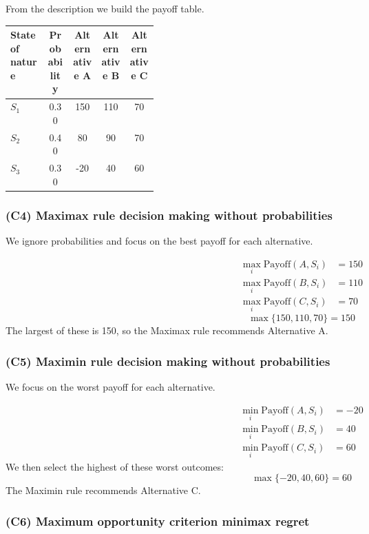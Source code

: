From the description we build the payoff table.

\begin{center}
	\begin{tabularx}{\linewidth}{@{}L{0.25\linewidth}C C C C@{}}
		\toprule
		State of nature & Probability & Alternative A & Alternative B & Alternative C \\
		\midrule
		\(S_1\) & 0.30 & 150 & 110 & 70 \\
		\(S_2\) & 0.40 & 80 & 90 & 70 \\
		\(S_3\) & 0.30 & -20 & 40 & 60 \\
		\bottomrule
	\end{tabularx}
\end{center}

\subsubsection{(C4) Maximax rule decision making without probabilities}\label{subsubsec:example1-1-c4}

We ignore probabilities and focus on the best payoff for each alternative.

\[
\begin{aligned}
\max_i \text{Payoff}(A, S_i) &= 150\\
\max_i \text{Payoff}(B, S_i) &= 110\\
\max_i \text{Payoff}(C, S_i) &= 70
\end{aligned}
\]
\[
\max\{150, 110, 70\} = 150
\]
The largest of these is 150, so the Maximax rule recommends Alternative A.

\subsubsection{(C5) Maximin rule decision making without probabilities}\label{subsubsec:example1-1-c5}

We focus on the worst payoff for each alternative.

\[
\begin{aligned}
\min_i \text{Payoff}(A, S_i) &= -20\\
\min_i \text{Payoff}(B, S_i) &= 40\\
\min_i \text{Payoff}(C, S_i) &= 60
\end{aligned}
\]
We then select the highest of these worst outcomes:
\[
\max\{-20, 40, 60\} = 60
\]
The Maximin rule recommends Alternative C.

\subsubsection{(C6) Maximum opportunity criterion minimax regret}\label{subsubsec:example1-1-c6}


